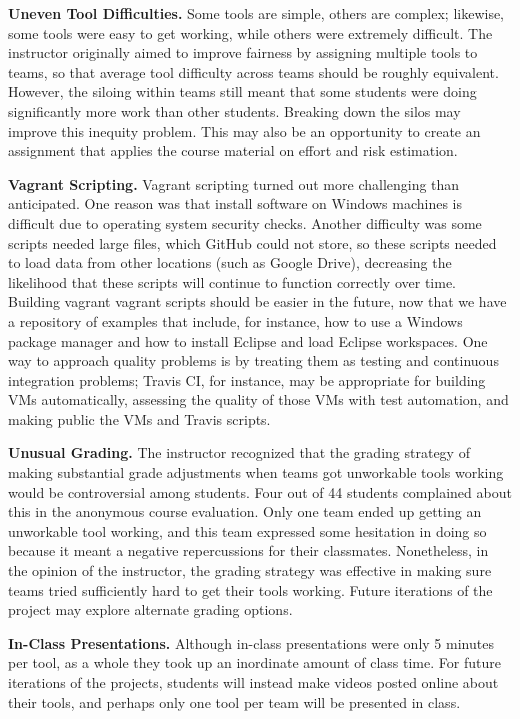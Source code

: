 \documentclass[10pt,conference]{IEEEtran}
\begin{document}
\textbf{Uneven Tool Difficulties.}
  	Some tools are simple, others are complex; likewise,
  	some tools were easy to get working, while others were extremely difficult.
  	The instructor originally aimed to improve fairness by assigning multiple tools
  	to teams, so that average tool difficulty across teams should be roughly equivalent.
  	However, the siloing within teams still meant that some students were doing
  	significantly more work than other students.  
  	Breaking down the silos may improve this inequity problem.
  	This may also be an opportunity to create an assignment that applies the course
  	material on effort and risk estimation.   	

\textbf{Vagrant Scripting.}
  	Vagrant scripting turned out more challenging than anticipated.
  	One reason was that install software on Windows machines is difficult
  	due to operating system security checks.
  	Another difficulty was some scripts needed large files, which GitHub could not
  	store, so these scripts needed to load data from other locations 
  	(such as Google Drive), decreasing the likelihood that these scripts will
  	continue to function correctly over time. 
  	Building vagrant vagrant scripts should be easier in the future, now that
  	we have a repository of examples that include, for instance, how to
  	use a Windows package manager and how to 
  	install Eclipse and load Eclipse workspaces. 
  	One way to approach quality problems is by treating them as testing and 
  	continuous integration problems; Travis CI,
  	for instance, may be appropriate for building VMs automatically,
  	assessing the quality of those VMs with test automation,
  	and making public the VMs and Travis scripts.

\textbf{Unusual Grading.} 
	The instructor recognized that the grading strategy of making substantial
	grade adjustments when teams got unworkable tools working would be 
	controversial among students.
	Four out of 44 students complained about this in the anonymous course
	evaluation.
	Only one team ended up getting an unworkable tool working, and this team expressed
	some hesitation in doing so because it meant a negative repercussions for their
	classmates.
	Nonetheless, in the opinion of the instructor, the grading strategy was effective
	in making sure teams tried sufficiently hard to get their tools working. 
 	Future iterations of the project may explore alternate grading options.

\textbf{In-Class Presentations.}
  	Although in-class presentations were only 5 minutes per tool, as a whole they
  	took up an inordinate amount of class time.
  	For future iterations of the projects, students will instead make videos posted
  	online about their tools, and perhaps only one tool per team will be presented
  	in class.
 
\end{document}
